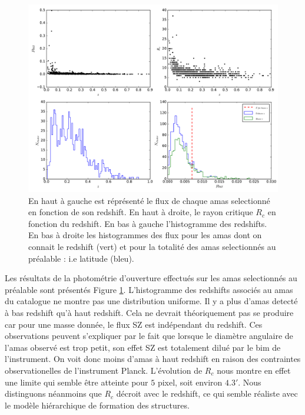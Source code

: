 \documentclass[a4paper,11pt]{article}
\begin{document}
\begin{figure}[h!]
  \centering
  \label{rslt_1}
  \includegraphics[scale = 0.4]{rslt_1.pdf}
  \caption{En haut à gauche est réprésenté le flux de chaque amas
    selectionné en fonction de son redshift. En haut à droite, le rayon critique
    $R_c$ en fonction du redshift. En bas à gauche l'histogramme des
    redshifts. En bas à droite les histogrammes des flux pour les amas
    dont on connait le redshift (vert) et pour la totalité des amas
    selectionnés au préalable : i.e latitude (bleu).}
\end{figure}

Les résultats de la photométrie d'ouverture effectués sur les amas
selectionnés au préalable sont présentés Figure
\ref{rslt_1}. L'histogramme des redshifts associés au amas du
catalogue ne montre pas une distribution uniforme. Il y a plus
d'amas detecté à bas redshift qu'à haut redshift. Cela ne devrait
théoriquement pas se produire car pour une masse donnée, le flux SZ
est indépendant du redshift. Ces observations peuvent s'expliquer par
le fait que lorsque le diamètre angulaire de l'amas observé est trop
petit, son effet SZ est totalement dilué par le bim de
l'instrument. On voit donc moins d'amas à haut redshift en raison des
contraintes observationelles de l'instrument Planck. L'évolution de
$R_c$ nous montre en effet une limite qui semble être atteinte pour $5$ pixel,
soit environ $4.3'$. Nous distinguons néanmoins que $R_c$ décroit avec
le redshift, ce qui semble réaliste avec le modèle hiérarchique de
formation des structures. \\
\end{document}
